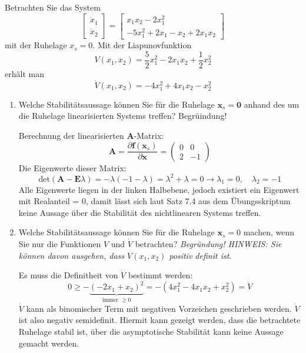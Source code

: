 \documentclass[crop=false]{standalone}
\begin{document}
\begin{taskbreak}
 Betrachten Sie das System
\[
\left[\begin{array}{c}{\dot{x}_{1}} \\ {\dot{x}_{2}}\end{array}\right]=\left[\begin{array}{c}{x_{1} x_{2}-2 x_{1}^{2}} \\ {-5 x_{1}^{2}+2 x_{1}-x_{2}+2 x_{1} x_{2}}\end{array}\right]
\]
mit der Ruhelage $x_{s}=0 .$ Mit der Liapunovfunktion
\[
V\left(x_{1}, x_{2}\right)=\frac{5}{2} x_{1}^{2}-2 x_{1} x_{2}+\frac{1}{2} x_{2}^{2}
\]
erhält man
\[
\dot{V}\left(x_{1}, x_{2}\right)=-4 x_{1}^{2}+4 x_{1} x_{2}-x_{2}^{2}
\]
\begin{enumerate}[i]
    \item Welche Stabilitätsaussage können Sie für die Ruhelage $\mathbf{x}_{s}=\mathbf{0}$ anhand des um
die Ruhelage linearisierten Systems treffen? Begrüindung!
    \begin{solution}
    Berechnung der linearisierten $\mathbf{A}$-Matrix:
    \[\mathbf{A} = \frac{\partial\mathbf{f}\left( \mathbf{x}_s \right)}{\partial\mathbf{x}}
    =\begin{pmatrix}
    0 & 0\\
    2 & -1
    \end{pmatrix}\]
    Die Eigenwerte dieser Matrix:
    \[ \text{det}\left( \mathbf{A} - \mathbf{E}\lambda \right) = -\lambda \left(-1-\lambda\right) = \lambda^2 + \lambda=0 \rightarrow \lambda_1 = 0, \quad \lambda_2 = -1\]
    Alle Eigenwerte liegen in der linken Halbebene, jedoch existiert ein Eigenwert mit Realanteil = 0, damit lässt sich laut Satz 7.4 aus dem Übungsskriptum keine Aussage über die Stabilität des nichtlinearen Systems treffen.
    \end{solution}
    \item Welche Stabilitätsaussage können Sie für die Ruhelage $\mathbf{x}_{s}=0$ machen, wenn Sie
nur die Funktionen $V$ und $\dot{V}$ betrachten? \emph{Begründung! HINWEIS: Sie können
davon ausgehen, dass $V\left(x_{1}, x_{2}\right)$ positiv definit ist.}
\begin{solution}
Es muss die Definitheit von $\dot{V}$ bestimmt werden:
\[0 \geq - \underbrace{\left( -2x_1 + x_2 \right)^2}_{\text{immer $\geq 0$}} = -\left(4x_{1}^2 - 4 x_1 x_2 + x_2^2 \right) = \dot{V} \]
$\dot{V}$ kann als binomischer Term mit negativen Vorzeichen geschrieben werden. $\dot{V}$ ist also negativ semidefinit. Hiermit kann gezeigt werden, dass die betrachtete Ruhelage stabil ist, über die asymptotische Stabilität kann keine Aussage gemacht werden.

\end{solution}
\end{enumerate}
\end{taskbreak}
\end{document}
